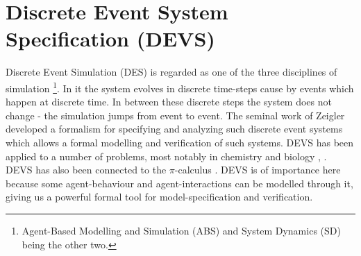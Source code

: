 \section{Discrete Event System Specification (DEVS)}
Discrete Event Simulation (DES) is regarded as one of the three disciplines of simulation \footnote{Agent-Based Modelling and Simulation (ABS) and System Dynamics (SD) being the other two.}. In it the system evolves in discrete time-steps cause by events which happen at discrete time. In between these discrete steps the system does not change - the simulation jumps from event to event. The seminal work of Zeigler \cite{zeigler_theory_2000} developed a formalism for specifying and analyzing such discrete event systems which allows a formal modelling and verification of such systems. DEVS has been applied to a number of problems, most notably in chemistry and biology \cite{ewald_discrete_2007}, \cite{uhrmacher_discrete_2005}. DEVS has also been connected to the $\pi$-calculus \cite{wang_pi-calculus_2008}.
DEVS is of importance here because some agent-behaviour and agent-interactions can be modelled through it, giving us a powerful formal tool for model-specification and verification.